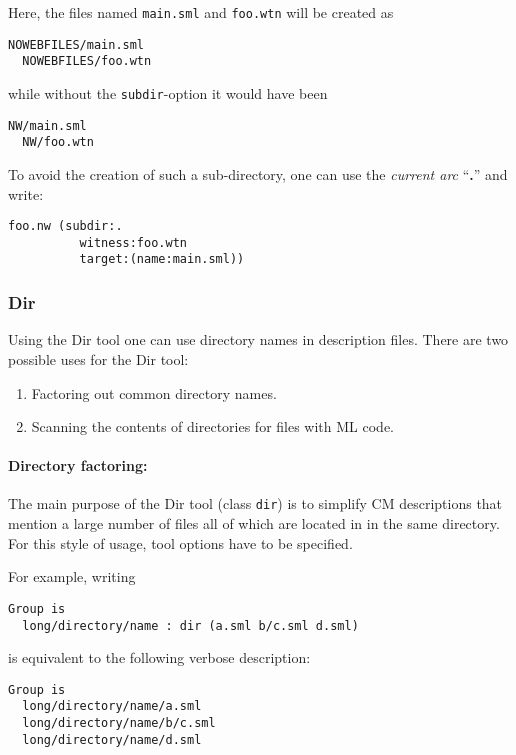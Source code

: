 Here, the files named {\tt main.sml} and {\tt foo.wtn} will be
created as
\begin{lstlisting}[language=CM]
  NOWEBFILES/main.sml
  NOWEBFILES/foo.wtn
\end{lstlisting}%
\noindent while without the {\tt subdir}-option it would have been
\begin{lstlisting}[language=CM]
  NW/main.sml
  NW/foo.wtn
\end{lstlisting}%
\noindent To avoid the creation of such a sub-directory, one can use
the {\em current arc} ``{\bf .}'' and write:
\begin{lstlisting}[language=CM]
  foo.nw (subdir:.
          witness:foo.wtn
          target:(name:main.sml))
\end{lstlisting}%

\subsubsection{Dir}
\label{sec:builtin-tools:dir}

Using the Dir tool one can use directory names in description files.
There are two possible uses for the Dir tool:

\begin{enumerate}
\item Factoring out common directory names.
\item Scanning the contents of directories for files with ML code.
\end{enumerate}

\paragraph{Directory factoring:}
The main purpose of the Dir tool (class {\tt dir}) is to simplify CM
descriptions that mention a large number of files all of which are
located in in the same directory.  For this style of usage, tool
options have to be specified.

For example, writing

\begin{lstlisting}[language=CM]
Group is
  long/directory/name : dir (a.sml b/c.sml d.sml)
\end{lstlisting}%

is equivalent to the following verbose description:

\begin{lstlisting}[language=CM]
Group is
  long/directory/name/a.sml
  long/directory/name/b/c.sml
  long/directory/name/d.sml
\end{lstlisting}%

